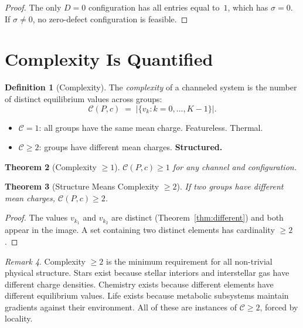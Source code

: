 \documentclass[11pt,a4paper]{article}
\theoremstyle{plain}
\newtheorem{theorem}{Theorem}[section]
\theoremstyle{definition}
\newtheorem{definition}[theorem]{Definition}
\theoremstyle{remark}
\newtheorem{remark}[theorem]{Remark}
\begin{document}
\begin{proof}
The only $D = 0$ configuration has all entries equal to~$1$, which has $\sigma = 0$.
If $\sigma \ne 0$, no zero-defect configuration is feasible.
\end{proof}

\section{Complexity Is Quantified}\label{sec:complexity}

\begin{definition}[Complexity]\label{def:complexity}
The \emph{complexity} of a channeled system is the number of distinct equilibrium values across groups:
\[
\mathcal{C}(P, c) \;=\; \bigl|\{v_k : k = 0,\ldots,K{-}1\}\bigr|.
\]
\end{definition}

\begin{itemize}[nosep]
\item $\mathcal{C} = 1$: all groups have the same mean charge. Featureless. Thermal.
\item $\mathcal{C} \ge 2$: groups have different mean charges. \textbf{Structured.}
\end{itemize}

\begin{theorem}[Complexity $\ge 1$]\label{thm:cpos}
$\mathcal{C}(P,c) \ge 1$ for any channel and configuration.
\end{theorem}

\begin{theorem}[Structure Means Complexity $\ge 2$]\label{thm:ctwo}
If two groups have different mean charges, $\mathcal{C}(P,c) \ge 2$.
\end{theorem}

\begin{proof}
The values $v_{k_1}$ and $v_{k_2}$ are distinct (Theorem~\ref{thm:different}) and both appear in the image.
A set containing two distinct elements has cardinality $\ge 2$.
\end{proof}

\begin{remark}
Complexity $\ge 2$ is the minimum requirement for all non-trivial physical structure.
Stars exist because stellar interiors and interstellar gas have different charge densities.
Chemistry exists because different elements have different equilibrium values.
Life exists because metabolic subsystems maintain gradients against their environment.
All of these are instances of $\mathcal{C} \ge 2$, forced by locality.
\end{remark}
\end{document}
